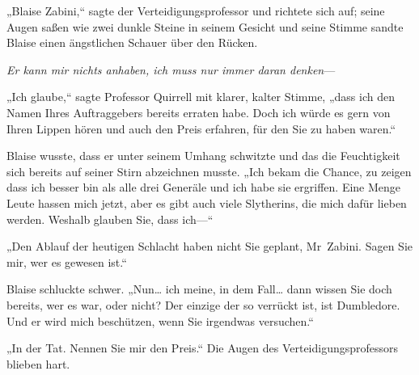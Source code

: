 „Blaise Zabini,“ sagte der Verteidigungsprofessor und richtete sich auf; seine Augen saßen wie zwei dunkle Steine in seinem Gesicht und seine Stimme sandte Blaise einen ängstlichen Schauer über den Rücken.

\emph{Er kann mir nichts anhaben, ich muss nur immer daran denken}—

„Ich glaube,“ sagte Professor Quirrell mit klarer, kalter Stimme, „dass ich den Namen Ihres Auftraggebers bereits erraten habe. Doch ich würde es gern von Ihren Lippen hören und auch den Preis erfahren, für den Sie zu haben waren.“

Blaise wusste, dass er unter seinem Umhang schwitzte und das die Feuchtigkeit sich bereits auf seiner Stirn abzeichnen musste. „Ich bekam die Chance, zu zeigen dass ich besser bin als alle drei Generäle und ich habe sie ergriffen. Eine Menge Leute hassen mich jetzt, aber es gibt auch viele Slytherins, die mich dafür lieben werden. Weshalb glauben Sie, dass ich—“

„Den Ablauf der heutigen Schlacht haben nicht Sie geplant, Mr~Zabini. Sagen Sie mir, wer es gewesen ist.“

Blaise schluckte schwer. „Nun… ich meine, in dem Fall… dann wissen Sie doch bereits, wer es war, oder nicht? Der einzige der so verrückt ist, ist Dumbledore. Und er wird mich beschützen, wenn Sie irgendwas versuchen.“

„In der Tat. Nennen Sie mir den Preis.“ Die Augen des Verteidigungsprofessors blieben hart.

